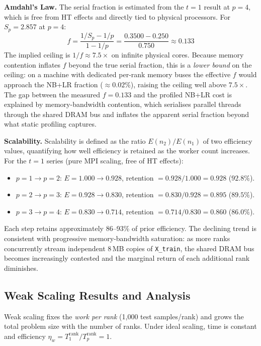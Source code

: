 \documentclass[12pt,a4paper]{article}
\begin{document}
\textbf{Amdahl's Law.}
The serial fraction is estimated from the $t=1$ result at $p=4$,
which is free from HT effects and directly tied to physical processors.
For $S_p = 2.857$ at $p = 4$:
\[
  f = \frac{1/S_p - 1/p}{1 - 1/p}
    = \frac{0.3500 - 0.250}{0.750}
    \approx 0.133
\]
The implied ceiling is $1/f \approx 7.5\times$ on infinite physical cores.
Because memory contention inflates $f$ beyond the true serial fraction,
this is a \emph{lower bound} on the ceiling: on a machine with dedicated
per-rank memory buses the effective $f$ would approach the NB+LR fraction
($\approx 0.02\%$), raising the ceiling well above $7.5\times$.
The gap between the measured $f=0.133$ and the profiled NB+LR cost is
explained by memory-bandwidth contention, which serialises parallel threads
through the shared DRAM bus and inflates the apparent serial fraction beyond
what static profiling captures.

\textbf{Scalability.}
Scalability is defined as the ratio $E(n_2)/E(n_1)$ of two efficiency values,
quantifying how well efficiency is retained as the worker count increases.
For the $t=1$ series (pure MPI scaling, free of HT effects):
\begin{itemize}
  \item $p=1 \to p=2$: $E=1.000 \to 0.928$,\quad
        retention $= 0.928/1.000 = 0.928$ ($92.8\%$).
  \item $p=2 \to p=3$: $E=0.928 \to 0.830$,\quad
        retention $= 0.830/0.928 = 0.895$ ($89.5\%$).
  \item $p=3 \to p=4$: $E=0.830 \to 0.714$,\quad
        retention $= 0.714/0.830 = 0.860$ ($86.0\%$).
\end{itemize}
Each step retains approximately 86--93\% of prior efficiency. The declining
trend is consistent with progressive memory-bandwidth saturation: as more
ranks concurrently stream independent 8\,MB copies of \texttt{X\_train},
the shared DRAM bus becomes increasingly contested and the marginal return of
each additional rank diminishes.

\subsection{Weak Scaling Results and Analysis}

Weak scaling fixes the \emph{work per rank} (1{,}000 test samples/rank) and
grows the total problem size with the number of ranks. Under ideal scaling,
time is constant and efficiency $\eta_w = T_1^\text{rank} / T_p^\text{rank} = 1$.
\end{document}
